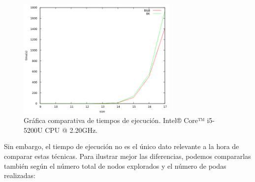\documentclass[11pt,a4paper]{article}
\begin{document}
		\begin{figure}[h]

			\centering
			\includegraphics[width=0.7\textwidth]{ComparativaB&B-BK.png}
			\caption{Gráfica comparativa de tiempos de ejecución. Intel® Core™ i5-5200U CPU @ 2.20GHz.}
			
		\end{figure}

\newpage

		\par
		Sin embargo, el tiempo de ejecución no es el único dato relevante a la hora de comparar estas técnicas. Para ilustrar mejor las diferencias, podemos compararlas también según el número total de nodos explorados y el número de podas realizadas:
		
		\vspace{2mm}
\end{document}
